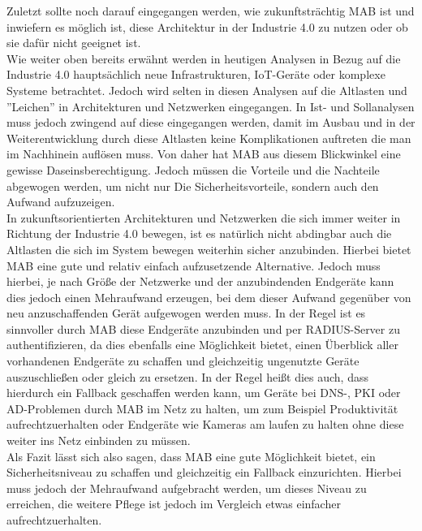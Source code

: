 \documentclass[conference]{IEEEtran}
\begin{document}
Zuletzt sollte noch darauf eingegangen werden, wie zukunftsträchtig MAB ist und inwiefern es möglich ist, diese Architektur in der Industrie 4.0 zu nutzen oder ob sie dafür nicht geeignet ist.\\

Wie weiter oben bereits erwähnt werden in heutigen Analysen in Bezug auf die Industrie 4.0 hauptsächlich neue Infrastrukturen, IoT-Geräte oder komplexe Systeme betrachtet. Jedoch wird selten in diesen Analysen auf die Altlasten und ''Leichen'' in Architekturen und Netzwerken eingegangen. In Ist- und Sollanalysen muss jedoch zwingend auf diese eingegangen werden, damit im Ausbau und in der Weiterentwicklung durch diese Altlasten keine Komplikationen auftreten die man im Nachhinein auflösen muss. Von daher hat MAB aus diesem Blickwinkel eine gewisse Daseinsberechtigung. Jedoch müssen die Vorteile und die Nachteile abgewogen werden, um nicht nur Die Sicherheitsvorteile, sondern auch den Aufwand aufzuzeigen.\\

In zukunftsorientierten Architekturen und Netzwerken die sich immer weiter in Richtung der Industrie 4.0 bewegen, ist es natürlich nicht abdingbar auch die Altlasten die sich im System bewegen weiterhin sicher anzubinden. Hierbei bietet MAB eine gute und relativ einfach aufzusetzende Alternative. Jedoch muss hierbei, je nach Größe der Netzwerke und der anzubindenden Endgeräte kann dies jedoch einen Mehraufwand erzeugen, bei dem dieser Aufwand gegenüber von neu anzuschaffenden Gerät aufgewogen werden muss. In der Regel ist es sinnvoller durch MAB diese Endgeräte anzubinden und per RADIUS-Server zu authentifizieren, da dies ebenfalls eine Möglichkeit bietet, einen Überblick aller vorhandenen Endgeräte zu schaffen und gleichzeitig ungenutzte Geräte auszuschließen oder gleich zu ersetzen. In der Regel heißt dies auch, dass hierdurch ein Fallback geschaffen werden kann, um Geräte bei DNS-, PKI oder AD-Problemen durch MAB im Netz zu halten, um zum Beispiel Produktivität aufrechtzuerhalten oder Endgeräte wie Kameras am laufen zu halten ohne diese weiter ins Netz einbinden zu müssen.\\

Als Fazit lässt sich also sagen, dass MAB eine gute Möglichkeit bietet, ein Sicherheitsniveau zu schaffen und gleichzeitig ein Fallback einzurichten. Hierbei muss jedoch der Mehraufwand aufgebracht werden, um dieses Niveau zu erreichen, die weitere Pflege ist jedoch im Vergleich etwas einfacher aufrechtzuerhalten.

%

\vspace{1em}


\end{document}
